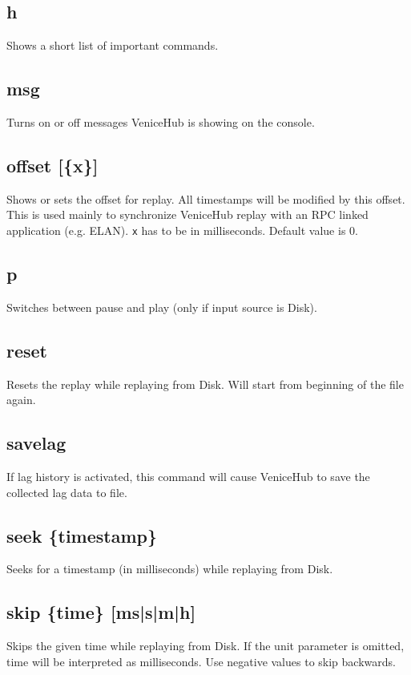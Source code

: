 \documentclass[german,a4paper]{article}
\begin{document}
\subsection{h}
Shows a short list of important commands.

\subsection{msg}
Turns on or off messages VeniceHub is showing on the console.

\subsection{offset [\{x\}]}
Shows or sets the offset for replay. All timestamps will be modified by this offset. This is used mainly to synchronize VeniceHub replay with an RPC linked application (e.g. ELAN). \texttt{x} has to be in milliseconds. Default value is 0.

\subsection{p}
Switches between pause and play (only if input source is Disk).

\subsection{reset}
Resets the replay while replaying from Disk. Will start from beginning of the file again.

\subsection{savelag}
If lag history is activated, this command will cause VeniceHub to save the collected lag data to file.

\subsection{seek \{timestamp\}}
Seeks for a timestamp (in milliseconds) while replaying from Disk.

\subsection{skip \{time\} [ms|s|m|h]}
Skips the given time while replaying from Disk. If the unit parameter is omitted, time will be interpreted as milliseconds. Use negative values to skip backwards.
\end{document}

